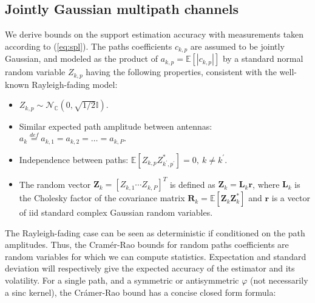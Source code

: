 \documentclass[journal,10pt]{IEEEtran}
\providecommand{\eqdef}{\overset{def}{=}}
\providecommand{\Cspace}{\mathbb{C}}
\providecommand{\Esp}[1]{\mathbb{E}\left[#1\right]}
\providecommand{\mat}[1]{\boldsymbol{#1}}
\providecommand{\vct}[1]{\boldsymbol{#1}}
\begin{document}
\subsection{Jointly Gaussian multipath channels}
We derive bounds on the support estimation accuracy with measurements taken according to (\ref{eq:spl}). The paths coefficients $c_{k,p}$ are assumed to be jointly Gaussian, and modeled as the product of $a_{k,p}=\Esp{\left|c_{k,p}\right|}$ by a standard normal random variable $Z_{k,p}$  having the following properties, consistent with the well-known Rayleigh-fading model:
\begin{itemize}
\item $Z_{k,p}\sim\mathcal N_\Cspace(0,\sqrt{1/2}\mathbb I)$.
\item Similar expected path amplitude between antennas: $a_k \eqdef a_{k,1}=a_{k,2}=\dots=a_{k,P}.$
\item Independence between paths: $\Esp{Z_{k,p}Z_{k^\prime,p^\prime}^\ast}=0,\ k\neq k^\prime.$
\item The random vector $\vct Z_k=[Z_{k,1} \cdots Z_{k,P}]^T$ is defined as
$\vct Z_k=\mat L_k \vct r$,
where $\mat L_k$ is the Cholesky factor of the covariance matrix $\mat R_k=\Esp{\vct Z_k\vct Z_k^\ast}$ and $\vct r$ is a vector of iid standard complex Gaussian random variables.
\end{itemize}
The Rayleigh-fading case can be seen as deterministic  if conditioned  on the path amplitudes. Thus, the Cram\'er-Rao bounds for random paths coefficients are random variables for which we can compute statistics. Expectation and standard deviation will respectively give the expected accuracy of the estimator and its volatility.
For a single path, and a symmetric or antisymmetric $\varphi$ (not necessarily a sinc kernel), the Cr\'amer-Rao bound has a concise closed form formula:
\end{document}
